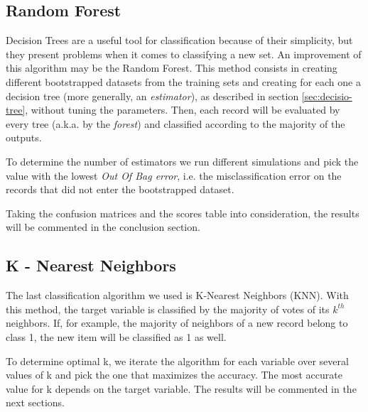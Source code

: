 \documentclass[a4paper,11pt,dvipsnames]{article}
\begin{document}
\subsection{Random Forest}

Decision Trees are a useful tool for classification because of their simplicity, but they present problems when it comes to classifying a new set. An improvement of this algorithm may be the Random Forest. This method consists in creating different bootstrapped datasets from the training sets and creating for each one a decision tree (more generally, an \textit{estimator}), as described in section \ref{sec:decisio-tree}, without tuning the parameters. Then, each record will be evaluated by every tree (a.k.a. by the \textit{forest}) and classified according to the majority of the outputs.

To determine the number of estimators we run different simulations and pick the value with the lowest \textit{Out Of Bag error}, i.e. the misclassification error on the records that did not enter the bootstrapped dataset.

Taking the confusion matrices and the scores table into consideration, the results will be commented in the conclusion section.


\subsection{K - Nearest Neighbors}
The last classification algorithm we used is K-Nearest Neighbors (KNN). With this method, the target variable is classified by the majority of votes of its $k^{th}$ neighbors. If, for example, the majority of neighbors of a new record belong to class 1, the new item will be classified as 1 as well.  


To determine optimal k, we iterate the algorithm for each variable over several values of k and pick the one that maximizes the accuracy. The most accurate value for k depends on the target variable. The results will be commented in the next sections.
\end{document}
